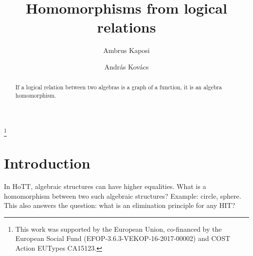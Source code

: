 \documentclass{lmcs} %
\theoremstyle{plain}\newtheorem{satz}[thm]{Satz} %
\begin{document}
\title[Short title TODO]{Homomorphisms from logical relations}

\author[A.~Kaposi]{Ambrus Kaposi}	%
\address{Department of Programming Languages and Compilers, E{\"o}tv{\"o}s Lor{\'a}nd University, Budapest, Hungary}	%

\author[A.~Kov{\'a}cs]{Andr{\'a}s Kov{\'a}cs}	%
\address{Department of Programming Languages and Compilers, E{\"o}tv{\"o}s Lor{\'a}nd University, Budapest, Hungary}	%
\thanks{This work was supported by the European Union, co-financed by the
European Social Fund (EFOP-3.6.3-VEKOP-16-2017-00002) and COST Action
EUTypes CA15123.}	%




\begin{abstract}
  \noindent If a logical relation between two algebras is a graph of a
  function, it is an algebra homomorphism. 
\end{abstract}

\maketitle

\section*{Introduction}

In HoTT, algebraic structures can have higher equalities. What is a
homomorphism between two such algebraic structures? Example: circle,
sphere. This also answers the question: what is an elimination
principle for any HIT?
\end{document}
